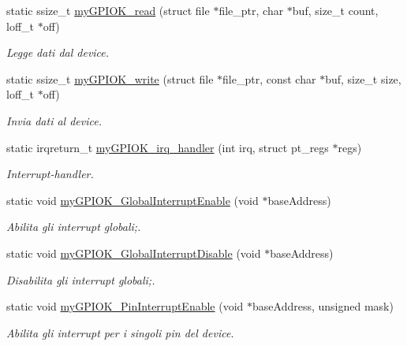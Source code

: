 \begin{DoxyCompactItemize}
static ssize\+\_\+t \hyperlink{group___linux-_driver_ga90ac339df9c02ae5f11a2a7727adc923}{my\+G\+P\+I\+O\+K\+\_\+read} (struct file $\ast$file\+\_\+ptr, char $\ast$buf, size\+\_\+t count, loff\+\_\+t $\ast$off)
\begin{DoxyCompactList}\small\item\em Legge dati dal device. \end{DoxyCompactList}\item 
static ssize\+\_\+t \hyperlink{group___linux-_driver_ga1eea0f6c86e8966ba9b701da57502aad}{my\+G\+P\+I\+O\+K\+\_\+write} (struct file $\ast$file\+\_\+ptr, const char $\ast$buf, size\+\_\+t size, loff\+\_\+t $\ast$off)
\begin{DoxyCompactList}\small\item\em Invia dati al device. \end{DoxyCompactList}\item 
static irqreturn\+\_\+t \hyperlink{group___linux-_driver_ga2fc230a12a97aa63e43b2dc4aec73511}{my\+G\+P\+I\+O\+K\+\_\+irq\+\_\+handler} (int irq, struct pt\+\_\+regs $\ast$regs)
\begin{DoxyCompactList}\small\item\em Interrupt-\/handler. \end{DoxyCompactList}\item 
static void \hyperlink{group___linux-_driver_gabd22e9dc7675ba815f1dd8840b39b2bf}{my\+G\+P\+I\+O\+K\+\_\+\+Global\+Interrupt\+Enable} (void $\ast$base\+Address)
\begin{DoxyCompactList}\small\item\em Abilita gli interrupt globali;. \end{DoxyCompactList}\item 
static void \hyperlink{group___linux-_driver_ga941f5d329dffbf6e45cecd70bbc72b63}{my\+G\+P\+I\+O\+K\+\_\+\+Global\+Interrupt\+Disable} (void $\ast$base\+Address)
\begin{DoxyCompactList}\small\item\em Disabilita gli interrupt globali;. \end{DoxyCompactList}\item 
static void \hyperlink{group___linux-_driver_ga15ddb23be51d3e2dbb00278af7e9ce31}{my\+G\+P\+I\+O\+K\+\_\+\+Pin\+Interrupt\+Enable} (void $\ast$base\+Address, unsigned mask)
\begin{DoxyCompactList}\small\item\em Abilita gli interrupt per i singoli pin del device. \end{DoxyCompactList}\item 

\end{DoxyCompactItemize}
